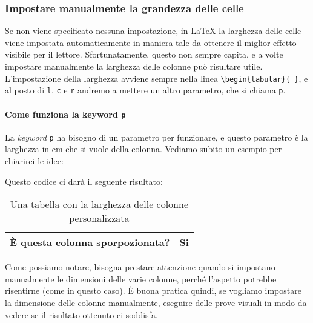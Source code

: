 \subsubsection{Impostare manualmente la grandezza delle celle}

Se non viene specificato nessuna impostazione, in \LaTeX{} la larghezza delle
celle viene impostata automaticamente in maniera tale da ottenere il miglior
effetto visibile per il lettore. Sfortunatamente, questo non sempre capita, e a
volte impostare manualmente la larghezza delle colonne può risultare utile.
L'impostazione della larghezza avviene sempre nella linea
\verb!\begin{tabular}{ }!, e al posto di \texttt{l}, \texttt{c} e \texttt{r}
andremo a mettere un altro parametro, che si chiama \texttt{p}.

\paragraph*{Come funziona la keyword \texttt{p}} La \textit{keyword} \texttt{p}
ha bisogno di un parametro per funzionare, e questo parametro è la larghezza in
cm che si vuole della colonna. Vediamo subito un esempio per chiarirci le idee:

\vspace{\abovedisplayskip}
\begin{minipage}{\linewidth}
  
\end{minipage}
\vspace{\belowdisplayskip}

\noindent Questo codice ci darà il seguente risultato:

\begin{table}[H]
\centering
\begin{tabular}{|p{2cm}|p{10cm}|}
\hline
È questa colonna sporpozionata? & Si \\ \hline
\end{tabular}
\caption{Una tabella con la larghezza delle colonne personalizzata}
\label{tab:es_spoporzionata}
\end{table}

\noindent Come possiamo notare, bisogna prestare attenzione quando si impostano
manualmente le dimensioni delle varie colonne, perché l'aspetto potrebbe
risentirne (come in questo caso). È buona pratica quindi, se vogliamo impostare
la dimensione delle colonne manualmente, eseguire delle prove visuali in modo
da vedere se il risultato ottenuto ci soddisfa.
